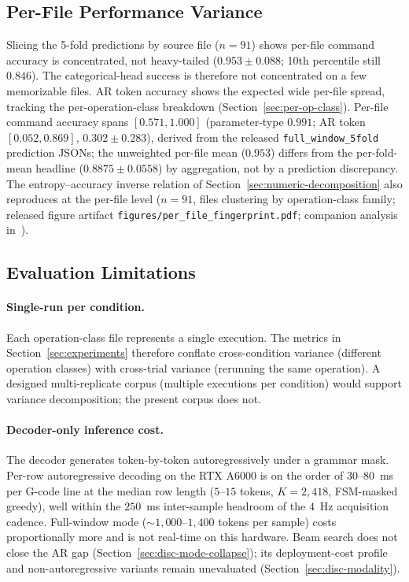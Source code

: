 \documentclass[sensors,article,submit,moreauthors,pdftex]{Definitions/mdpi}
\begin{document}
\subsection{Per-File Performance Variance}
\label{sec:lim-per-file}

Slicing the 5-fold predictions by source file ($n=91$) shows per-file command accuracy is concentrated, not heavy-tailed ($0.953 \pm 0.088$; 10th percentile still $0.846$). The categorical-head success is therefore not concentrated on a few memorizable files. AR token accuracy shows the expected wide per-file spread, tracking the per-operation-class breakdown (Section~\ref{sec:per-op-class}). Per-file command accuracy spans $[0.571, 1.000]$ (parameter-type $0.991$; AR token $[0.052, 0.869]$, $0.302 \pm 0.283$), derived from the released \texttt{full\_window\_5fold} prediction JSONs; the unweighted per-file mean ($0.953$) differs from the per-fold-mean headline ($0.8875 \pm 0.0558$) by aggregation, not by a prediction discrepancy. The entropy--accuracy inverse relation of Section~\ref{sec:numeric-decomposition} also reproduces at the per-file level ($n\!=\!91$, files clustering by operation-class family; released figure artifact \texttt{figures/per\_file\_fingerprint.pdf}; companion analysis in~\cite{paperB_entropy}).

\subsection{Evaluation Limitations}
\label{sec:lim-eval}

\paragraph{Single-run per condition.} Each operation-class file represents a single execution. The metrics in Section~\ref{sec:experiments} therefore conflate cross-condition variance (different operation classes) with cross-trial variance (rerunning the same operation). A designed multi-replicate corpus (multiple executions per condition) would support variance decomposition; the present corpus does not.

\paragraph{Decoder-only inference cost.} The decoder generates token-by-token autoregressively under a grammar mask. Per-row autoregressive decoding on the RTX A6000 is on the order of $30$--$80$~ms per G-code line at the median row length ($5$--$15$ tokens, $K\!=\!2{,}418$, FSM-masked greedy), well within the $250$~ms inter-sample headroom of the $4$~Hz acquisition cadence. Full-window mode ($\sim$$1{,}000$--$1{,}400$ tokens per sample) costs proportionally more and is not real-time on this hardware. Beam search does not close the AR gap (Section~\ref{sec:disc-mode-collapse}); its deployment-cost profile and non-autoregressive variants remain unevaluated (Section~\ref{sec:disc-modality}).
\end{document}
